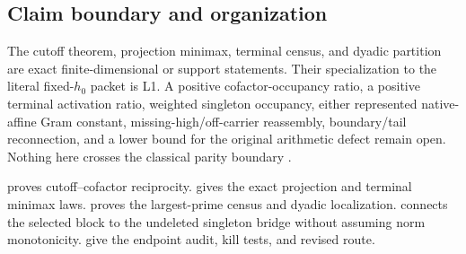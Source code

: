 \subsection{Claim boundary and organization}

The cutoff theorem, projection minimax, terminal census, and dyadic
partition are exact finite-dimensional or support statements.  Their
specialization to the literal fixed-\(h_0\) packet is L1.  A positive
cofactor-occupancy ratio, a positive terminal activation ratio, weighted
singleton occupancy, either represented native-affine Gram constant,
missing-high/off-carrier reassembly, boundary/tail reconnection, and a
lower bound for the original arithmetic defect remain open.  Nothing here
crosses the classical parity boundary
\citep{FriedlanderIwaniec2010}.

 proves cutoff--cofactor reciprocity.
 gives the exact projection and terminal minimax
laws.   proves the largest-prime census and dyadic
localization.   connects the selected block to the
undeleted singleton bridge without assuming norm monotonicity.
 give the endpoint audit, kill
tests, and revised route.
